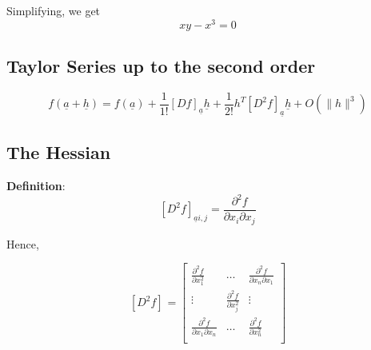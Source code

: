Simplifying, we get
\[
  xy - x^3 = 0
\] 

\subsection{Taylor Series up to the second order}

\begin{framed}
   \[
     f ( \underline{a} + \underline{h}) = f ( \underline{a}) + \frac{1}{1!} \left[ D f \right]_{ \underline{a}} \underline{h} + \frac{1}{2!} h^T \left[ D^2 f \right]_{ \underline{a}} \underline{h} + O( \lVert h \rVert^3)
   \] 
\end{framed}

\subsection{The Hessian}
\begin{framed}
   \textbf{Definition}: 
   \[
   \left[ D^2 f \right]_{ \underline{a} i, j} = \frac{\partial^2 f}{\partial x_i \partial x_j}
   \] 

   Hence, 

   \[
     \left[ D^2 f \right]_{}  = \begin{bmatrix} 
        \frac{\partial^2 f}{\partial x_1^2} & \hdots & \frac{\partial^2 f}{\partial x_n \partial x_1}   \\
        \vdots & \frac{\partial^2 f}{\partial x_j^2} & \vdots   \\
        \frac{\partial^2 f}{\partial x_1 \partial x_n} & \hdots & \frac{\partial^2 f}{\partial x_n^2 }   \\
     \end{bmatrix}
   \] 
\end{framed}









